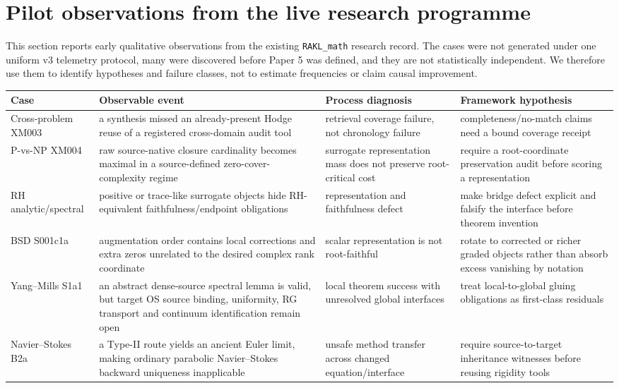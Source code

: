 \section{Pilot observations from the live research programme}

This section reports early qualitative observations from the existing \texttt{RAKL\_math} research record. The cases were not generated under one uniform v3 telemetry protocol, many were discovered before Paper 5 was defined, and they are not statistically independent. We therefore use them to identify hypotheses and failure classes, not to estimate frequencies or claim causal improvement.

\begin{table}[ht]
\centering
\small
\begin{tabularx}{\textwidth}{p{}p{}Y Y}
\toprule
Case & Observable event & Process diagnosis & Framework hypothesis \\
\midrule
Cross-problem XM003 & a synthesis missed an already-present Hodge reuse of a registered cross-domain audit tool & retrieval coverage failure, not chronology failure & completeness/no-match claims need a bound coverage receipt \\
P-vs-NP XM004 & raw source-native closure cardinality becomes maximal in a source-defined zero-cover-complexity regime & surrogate representation mass does not preserve root-critical cost & require a root-coordinate preservation audit before scoring a representation \\
RH analytic/spectral & positive or trace-like surrogate objects hide RH-equivalent faithfulness/endpoint obligations & representation and faithfulness defect & make bridge defect explicit and falsify the interface before theorem invention \\
BSD S001c1a & augmentation order contains local corrections and extra zeros unrelated to the desired complex rank coordinate & scalar representation is not root-faithful & rotate to corrected or richer graded objects rather than absorb excess vanishing by notation \\
Yang--Mills S1a1 & an abstract dense-source spectral lemma is valid, but target OS source binding, uniformity, RG transport and continuum identification remain open & local theorem success with unresolved global interfaces & treat local-to-global gluing obligations as first-class residuals \\
Navier--Stokes B2a & a Type-II route yields an ancient Euler limit, making ordinary parabolic Navier--Stokes backward uniqueness inapplicable & unsafe method transfer across changed equation/interface & require source-to-target inheritance witnesses before reusing rigidity tools \\

\end{tabularx}
\end{table}
